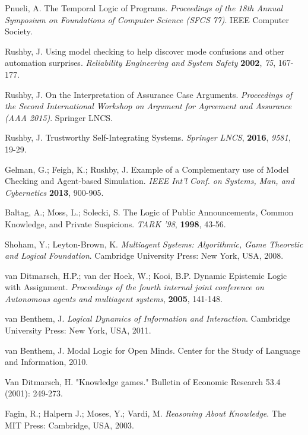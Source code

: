 \begin{thebibliography}{9}
	 	Pnueli, A.  The Temporal Logic of Programs. {\em Proceedings of the 18th Annual Symposium on Foundations of Computer Science (SFCS 77)}. IEEE Computer Society.
	 	
	 	Rushby, J. Using model checking to help discover mode confusions and other automation surprises. {\em Reliability Engineering and System Safety} {\bf 2002}, {\em 75}, 167-177.
	 	
	 	Rushby, J. On the Interpretation of Assurance Case Arguments. {\em Proceedings of the Second International Workshop on Argument for Agreement and Assurance (AAA 2015)}. Springer LNCS.
	 	
	 	Rushby, J. Trustworthy Self-Integrating Systems. {\em Springer LNCS}, {\bf 2016}, {\em 9581}, 19-29.
	 	
	 	Gelman, G.; Feigh, K.; Rushby, J. Example of a Complementary use of Model Checking and Agent-based Simulation. {\em IEEE Int'l Conf. on Systems, Man, and Cybernetics} {\bf 2013}, 900-905.
	 	
	 	
	 	
	 	Baltag, A.; Moss, L.; Solecki, S. The Logic of Public Announcements, Common Knowledge, and Private Suspicions. {\em TARK '98}, {\bf 1998}, 43-56.
	 	
	 	Shoham, Y.; Leyton-Brown, K. {\em Multiagent Systems: Algorithmic, Game Theoretic and Logical Foundation}. Cambridge University Press: New York, USA, 2008.
	 	
	 	van Ditmarsch, H.P.; van der Hoek, W.; Kooi, B.P. Dynamic Epistemic Logic with Assignment. {\em Proceedings of the fourth internal joint conference on Autonomous agents and multiagent systems}, {\bf 2005}, 141-148.
	 	
	 	van Benthem, J. {\em Logical Dynamics of Information and Interaction}. Cambridge University Press: New York, USA, 2011.
	 	
	 	van Benthem, J. Modal Logic for Open Minds. Center for the Study of Language and Information, 2010.
	 	
	 	Van Ditmarsch, H. "Knowledge games." Bulletin of Economic Research 53.4 (2001): 249-273.
	 	
	 	Fagin, R.; Halpern J.; Moses, Y.; Vardi, M. {\em Reasoning About Knowledge}. The MIT Press: Cambridge, USA, 2003.
	 	

\end{thebibliography}
